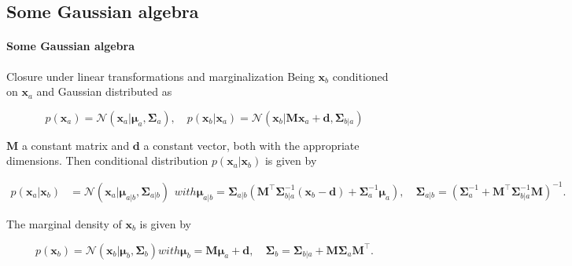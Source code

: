 \subsection{Some Gaussian algebra}

\begin{frame}{\insertsection}
	\framesubtitle{Some Gaussian algebra}

	\begin{block}{Closure under linear transformations and marginalization}
		Being $\mathbf{x}_b$ conditioned on $\mathbf{x}_a$ and Gaussian distributed as

    \begin{equation*}
      p\left(\mathbf{x}_{a}\right)=\mathcal{N}\left(\mathbf{x}_{a} | \boldsymbol{\mu}_{a}, \boldsymbol{\Sigma}_{a}\right), \quad p\left(\mathbf{x}_{b} | \mathbf{x}_{a}\right)=\mathcal{N}\left(\mathbf{x}_{b} | \mathbf{M} \mathbf{x}_{a}+\mathbf{d}, \boldsymbol{\Sigma}_{b | a}\right)
    \end{equation*}

     $\mathbf{M}$ a constant matrix and $\mathbf{d}$ a constant vector, both with the appropriate dimensions. Then conditional distribution $p(\mathbf{x}_a|\mathbf{x}_b)$ is given by

    \begin{subequations}
    
    \begin{align*}
      p\left(\mathbf{x}_{a} | \mathbf{x}_{b}\right)&=\mathcal{N}\left(\mathbf{x}_{a} | \boldsymbol{\mu}_{a | b}, \boldsymbol{\Sigma}_{a | b}\right)
    \end{align*}
    with
    \begin{equation*}
        \boldsymbol{\mu}_{a | b}=\boldsymbol{\Sigma}_{a | b}\left(\mathbf{M}^\top \boldsymbol{\Sigma}_{b | a}^{-1}\left(\mathbf{x}_{b}-\mathbf{d}\right)+\boldsymbol{\Sigma}_{a}^{-1} \boldsymbol{\mu}_{a}\right), \quad \boldsymbol{\Sigma}_{a | b}=\left(\boldsymbol{\Sigma}_{a}^{-1}+\mathbf{M}^\top \boldsymbol{\Sigma}_{b | a}^{-1} \mathbf{M}\right)^{-1}.
    \end{equation*}
  	\end{subequations}
	
	The marginal density of $\mathbf{x}_b$ is given by

	\begin{subequations}
		\begin{equation*}
		p\left(\mathbf{x}_{b}\right)=\mathcal{N}\left(\mathbf{x}_{b} | \boldsymbol{\mu}_{b}, \boldsymbol{\Sigma}_{b}\right)
		\end{equation*}
		with
		\begin{equation*}
		\boldsymbol{\mu}_{b} =\mathbf{M} \boldsymbol{\mu}_{a}+\mathbf{d} , \quad \boldsymbol{\Sigma}_{b} =\boldsymbol{\Sigma}_{b | a}+\mathbf{M} \boldsymbol{\Sigma}_{a} \mathbf{M}^\top .
		\end{equation*}
	\end{subequations}
	\end{block}	
\end{frame}

